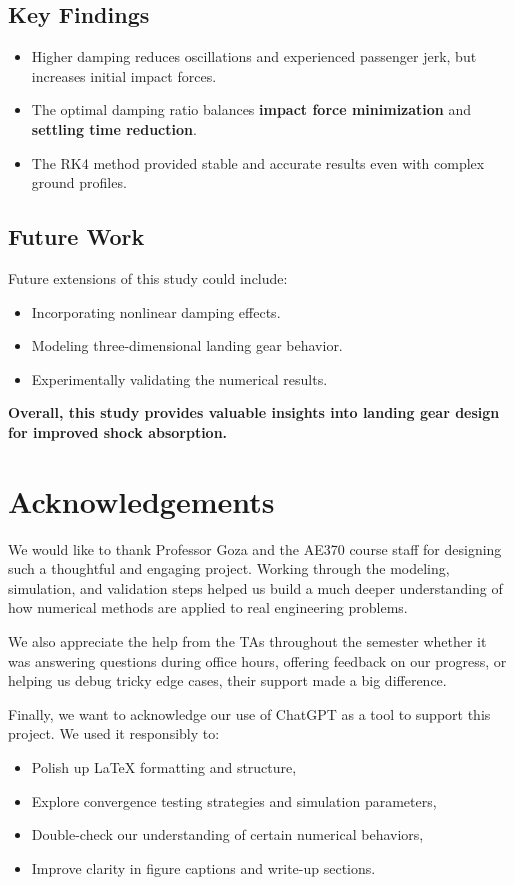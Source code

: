 \documentclass[12pt,letterpaper, onecolumn]{exam}
\begin{document}
\subsection{Key Findings}
\begin{itemize}
    \item Higher damping reduces oscillations and experienced passenger jerk, but increases initial impact forces.
    \item The optimal damping ratio balances \textbf{impact force minimization} and \textbf{settling time reduction}.
    \item The RK4 method provided stable and accurate results even with complex ground profiles.
\end{itemize}

\subsection{Future Work}
Future extensions of this study could include:
\begin{itemize}
    \item Incorporating nonlinear damping effects.
    \item Modeling three-dimensional landing gear behavior.
    \item Experimentally validating the numerical results.
\end{itemize}

\textbf{Overall, this study provides valuable insights into landing gear design for improved shock absorption.}

\newpage

\section*{Acknowledgements}

We would like to thank Professor Goza and the AE370 course staff for designing such a thoughtful and engaging project. Working through the modeling, simulation, and validation steps helped us build a much deeper understanding of how numerical methods are applied to real engineering problems.

We also appreciate the help from the TAs throughout the semester whether it was answering questions during office hours, offering feedback on our progress, or helping us debug tricky edge cases, their support made a big difference.

Finally, we want to acknowledge our use of ChatGPT as a tool to support this project. We used it responsibly to:
\begin{itemize}
    \item Polish up LaTeX formatting and structure,
    \item Explore convergence testing strategies and simulation parameters,
    \item Double-check our understanding of certain numerical behaviors,
    \item Improve clarity in figure captions and write-up sections.
\end{itemize}
\end{document}
